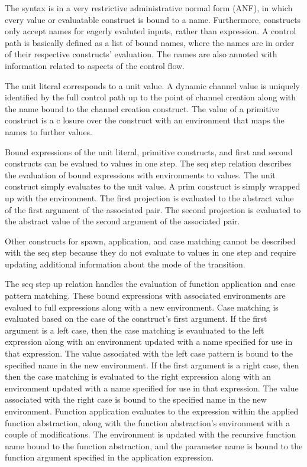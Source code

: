 \documentclass{article}
\begin{document}
The syntax is in a very restrictive administrative normal form (ANF), in which every value or evaluatable construct is bound to a
name.  Furthermore, constructs only accept names for eagerly evaluted inputs, rather than expression.  A control path is basically
defined as a list of bound names, where the names are in order of their respective constructs' evaluation. The names are also annoted with information related to aspects of the control flow.

The unit literal corresponds to a unit value. A dynamic channel value is uniquely identified by the full control path up to the
point of channel creation along with the name bound to the channel creation construct. The value of a primitive construct is a c
losure over the construct with an environment that maps the names to further values.

Bound expressions of the unit literal, primitive constructs, and first and second constructs can be evalued to values in one step.  The seq step relation describes the evaluation of bound expressions with environments to values.  The unit construct simply evaluates
to the unit value.  A prim construct is simply wrapped up with the environment.  The first projection is evaluated to the abstract value of the first argument of the associated pair. The second projection is evaluated to the abstract value of the second argument of the associated pair.

Other constructs for spawn, application, and case matching cannot be described with the seq step because
they do not evaluate to values in one step and require updating additional information about the mode of the transition. 

The seq step up relation handles the evaluation of function application and case pattern matching.  These bound expressions with
associated environments are evalued to full expressions along with a new environment.  Case matching is evaluated based on the case of the construct's first argument.  If the first argument is a left case, then the case matching is evauluated to the left expression along with an
environment updated with a name specified for use in that expression.  The value associated with the left case pattern is bound to
the specified name in the new environment. If the first argument is a right case, then then the case matching is evaluated to the right expression
along with an environment updated with a name specified for use in that expression.  The value associated with the right case
 is bound to the specified name in the new environment. Function application evaluates to the expression within the applied function abstraction, along with the function abstraction's environment with a couple of modifications.  The environment is updated with the recursive function name bound to the function abstraction, and the parameter name is bound to the function argument specified in the application expression. 
\end{document}
